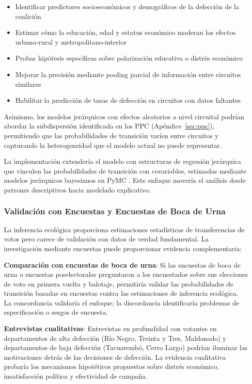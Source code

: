 \begin{itemize}
    \item Identificar predictores socioeconómicos y demográficos de la defección de la coalición
    \item Estimar cómo la educación, edad y estatus económico moderan los efectos urbano-rural y metropolitano-interior
    \item Probar hipótesis específicas sobre polarización educativa o distrés económico
    \item Mejorar la precisión mediante pooling parcial de información entre circuitos similares
    \item Habilitar la predicción de tasas de defección en circuitos con datos faltantes
\end{itemize}

Asimismo, los modelos jerárquicos con efectos aleatorios a nivel circuital podrían abordar la subdispersión identificada en los PPC (Apéndice~\ref{sec:ppc}), permitiendo que las probabilidades de transición varíen entre circuitos y capturando la heterogeneidad que el modelo actual no puede representar.

La implementación extendería el modelo con estructuras de regresión jerárquica que vinculen las probabilidades de transición con covariables, estimadas mediante modelos jerárquicos bayesianos en PyMC \citep{abril2023pymc}. Este enfoque movería el análisis desde patrones descriptivos hacia modelado explicativo.

\subsubsection{Validación con Encuestas y Encuestas de Boca de Urna}

La inferencia ecológica proporciona estimaciones estadísticas de transferencias de votos pero carece de validación con datos de verdad fundamental. La investigación mediante encuestas puede proporcionar evidencia complementaria:

\textbf{Comparación con encuestas de boca de urna}: Si las encuestas de boca de urna o encuestas poselectorales preguntaron a los encuestados sobre sus elecciones de voto en primera vuelta y balotaje, permitiría validar las probabilidades de transición basadas en encuestas contra las estimaciones de inferencia ecológica. La concordancia validaría el enfoque; la discordancia identificaría problemas de especificación o sesgos de encuesta.

\textbf{Entrevistas cualitativas}: Entrevistas en profundidad con votantes en departamentos de alta defección (Río Negro, Treinta y Tres, Maldonado) y departamentos de baja defección (Tacuarembó, Cerro Largo) podrían iluminar las motivaciones detrás de las decisiones de defección. La evidencia cualitativa probaría los mecanismos hipotéticos propuestos sobre distrés económico, insatisfacción política y efectividad de campaña.

